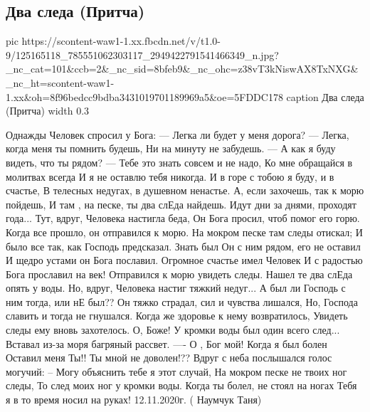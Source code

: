  
 
 

\subsection{Два следа (Притча)}
\label{sec:13_11_2020.fb.tanya_naumchuk.1.dva_sleda}

\ifcmt
pic https://scontent-waw1-1.xx.fbcdn.net/v/t1.0-9/125165118_785551062303117_2949422791541466349_n.jpg?_nc_cat=101&ccb=2&_nc_sid=8bfeb9&_nc_ohc=z38vT3kNiswAX8TxNXG&_nc_ht=scontent-waw1-1.xx&oh=8f96bedcc9bdba3431019701189969a5&oe=5FDDC178
caption Два следа (Притча)
width 0.3
\fi

\begin{multicols}{2}
\obeycr
Однажды Человек спросил у Бога:
--- Легка ли будет у меня дорога?
--- Легка, когда меня ты помнить будешь,
Ни на минуту не забудешь.
--- А как я буду видеть, что ты рядом?
--- Тебе  это знать совсем и не надо,
Ко мне обращайся в молитвах всегда
И я не оставлю тебя никогда.
И в горе с тобою я буду, и в счастье,
В телесных недугах, в душевном ненастье.
А, если захочешь, так к морю пойдешь,
И там , на песке, ты два слЕда найдешь.
Идут дни за днями, проходят года...
Тут, вдруг, Человека настигла беда,
Он Бога просил, чтоб помог его горю.
Когда все прошло, он отправился к морю.
На мокром песке там следы отискал;
И было все так, как Господь предсказал.
Знать был Он с ним рядом, его не оставил
И щедро устами он Бога пославил.
Огромное счастье имел Человек
И с радостью Бога прославил на век!
Отправился к морю увидеть следы.
Нашел те два слЕда опять у воды.
Но, вдруг, Человека настиг тяжкий недуг...
А был ли Господь с ним тогда, или нЕ был??
Он тяжко страдал, сил и чувства лишался,
Но, Господа славить и тогда не гнушался.
Когда же здоровье к нему возвратилось,
Увидеть следы ему вновь захотелось.
О, Боже! У кромки воды был один всего след...
Вставал из-за моря багряный рассвет.
---- О , Бог мой! Когда я был болен
Оставил меня Ты!! Ты мной не доволен!??
Вдруг с неба послышался голос могучий:
-- Могу объяснить тебе я этот случай,
На мокром песке не твоих ног следы,
То след моих ног у кромки воды.
Когда ты болел, не стоял на ногах
Тебя я в то время носил на руках!
12.11.2020г.  ( Наумчук Таня)
\restorecr
\end{multicols}

